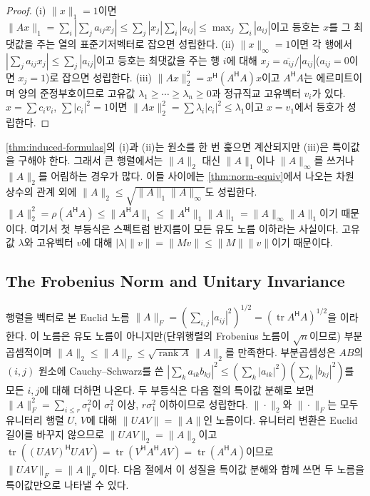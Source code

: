 \begin{proof}
(i) $\|x\|_1=1$이면 $\|Ax\|_1=\sum_i|\sum_ja_{ij}x_j|\le\sum_j|x_j|\sum_i|a_{ij}|\le\max_j\sum_i|a_{ij}|$이고 등호는 $x$를 그 최댓값을 주는 열의 표준기저벡터로 잡으면 성립한다. (ii) $\|x\|_\infty=1$이면 각 행에서 $|\sum_ja_{ij}x_j|\le\sum_j|a_{ij}|$이고 등호는 최댓값을 주는 행 $i$에 대해 $x_j=\overline{a_{ij}}/|a_{ij}|$($a_{ij}=0$이면 $x_j=1$)로 잡으면 성립한다. (iii) $\|Ax\|_2^2=x^{\mathsf H}(A^{\mathsf H}A)x$이고 $A^{\mathsf H}A$는 에르미트이며 양의 준정부호이므로 고유값 $\lambda_1\ge\cdots\ge\lambda_n\ge0$과 정규직교 고유벡터 $v_i$가 있다. $x=\sum c_iv_i$, $\sum|c_i|^2=1$이면 $\|Ax\|_2^2=\sum\lambda_i|c_i|^2\le\lambda_1$이고 $x=v_1$에서 등호가 성립한다.
\end{proof}

\cref{thm:induced-formulas}의 (i)과 (ii)는 원소를 한 번 훑으면 계산되지만 (iii)은 특이값을 구해야 한다. 그래서 큰 행렬에서는 $\|A\|_2$ 대신 $\|A\|_1$이나 $\|A\|_\infty$를 쓰거나 $\|A\|_2$를 어림하는 경우가 많다. 이들 사이에는 \cref{thm:norm-equiv}에서 나오는 차원 상수의 관계 외에 $\|A\|_2\le\sqrt{\|A\|_1\|A\|_\infty}$도 성립한다. $\|A\|_2^2=\rho(A^{\mathsf H}A)\le\|A^{\mathsf H}A\|_1\le\|A^{\mathsf H}\|_1\|A\|_1=\|A\|_\infty\|A\|_1$이기 때문이다. 여기서 첫 부등식은 스펙트럼 반지름이 모든 유도 노름 이하라는 사실이다. 고유값 $\lambda$와 고유벡터 $v$에 대해 $|\lambda|\|v\|=\|Mv\|\le\|M\|\|v\|$이기 때문이다.

\subsection{The Frobenius Norm and Unitary Invariance}

행렬을 벡터로 본 Euclid 노름 $\|A\|_F=(\sum_{i,j}|a_{ij}|^2)^{1/2}=(\operatorname{tr}A^{\mathsf H}A)^{1/2}$을 이라 한다. 이 노름은 유도 노름이 아니지만(단위행렬의 Frobenius 노름이 $\sqrt n$이므로) 부분곱셈적이며 $\|A\|_2\le\|A\|_F\le\sqrt{\operatorname{rank}A}\,\|A\|_2$를 만족한다. 부분곱셈성은 $AB$의 $(i,j)$ 원소에 Cauchy--Schwarz를 쓴 $|\sum_ka_{ik}b_{kj}|^2\le(\sum_k|a_{ik}|^2)(\sum_k|b_{kj}|^2)$를 모든 $i,j$에 대해 더하면 나온다. 두 부등식은 다음 절의 특이값 분해로 보면 $\|A\|_F^2=\sum_{i\le r}\sigma_i^2$이 $\sigma_1^2$ 이상, $r\sigma_1^2$ 이하이므로 성립한다. $\|\cdot\|_2$와 $\|\cdot\|_F$는 모두 유니터리 행렬 $U$, $V$에 대해 $\|UAV\|=\|A\|$인  노름이다. 유니터리 변환은 Euclid 길이를 바꾸지 않으므로 $\|UAV\|_2=\|A\|_2$이고 $\operatorname{tr}((UAV)^{\mathsf H}UAV)=\operatorname{tr}(V^{\mathsf H}A^{\mathsf H}AV)=\operatorname{tr}(A^{\mathsf H}A)$이므로 $\|UAV\|_F=\|A\|_F$이다. 다음 절에서 이 성질을 특이값 분해와 함께 쓰면 두 노름을 특이값만으로 나타낼 수 있다.

